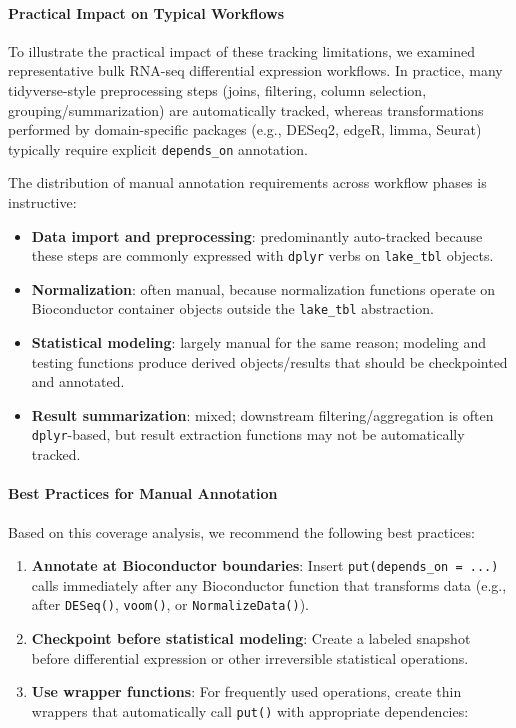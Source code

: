 \documentclass[11pt,a4paper]{article}
\begin{document}
\paragraph{Practical Impact on Typical Workflows}
To illustrate the practical impact of these tracking limitations, we examined representative bulk RNA-seq differential expression workflows. In practice, many tidyverse-style preprocessing steps (joins, filtering, column selection, grouping/summarization) are automatically tracked, whereas transformations performed by domain-specific packages (e.g., DESeq2, edgeR, limma, Seurat) typically require explicit \texttt{depends\_on} annotation.

The distribution of manual annotation requirements across workflow phases is instructive:

\begin{itemize}
    \item \textbf{Data import and preprocessing}: predominantly auto-tracked because these steps are commonly expressed with \texttt{dplyr} verbs on \texttt{lake\_tbl} objects.
    \item \textbf{Normalization}: often manual, because normalization functions operate on Bioconductor container objects outside the \texttt{lake\_tbl} abstraction.
    \item \textbf{Statistical modeling}: largely manual for the same reason; modeling and testing functions produce derived objects/results that should be checkpointed and annotated.
    \item \textbf{Result summarization}: mixed; downstream filtering/aggregation is often \texttt{dplyr}-based, but result extraction functions may not be automatically tracked.
\end{itemize}

\paragraph{Best Practices for Manual Annotation}
Based on this coverage analysis, we recommend the following best practices:

\begin{enumerate}
    \item \textbf{Annotate at Bioconductor boundaries}: Insert \texttt{put(depends\_on = ...)} calls immediately after any Bioconductor function that transforms data (e.g., after \texttt{DESeq()}, \texttt{voom()}, or \texttt{NormalizeData()}).
    \item \textbf{Checkpoint before statistical modeling}: Create a labeled snapshot before differential expression or other irreversible statistical operations.
    \item \textbf{Use wrapper functions}: For frequently used operations, create thin wrappers that automatically call \texttt{put()} with appropriate dependencies:
\end{enumerate}
\end{document}
